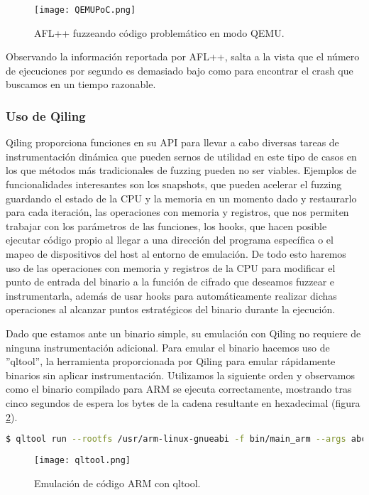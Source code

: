 \begin{figure}[H]
    \centering
    \texttt{[image: QEMUPoC.png]}
    \caption{AFL++ fuzzeando código problemático en modo QEMU.}
    \label{fig:QEMUPoC}
\end{figure}

Observando la información reportada por AFL++, salta a la vista que el número de ejecuciones por segundo es demasiado bajo como para encontrar 
el crash que buscamos en un tiempo razonable.

\subsubsection{Uso de Qiling}
Qiling proporciona funciones en su API para llevar a cabo diversas tareas de instrumentación dinámica que pueden sernos de utilidad en este 
tipo de casos en los que métodos más tradicionales de fuzzing pueden no ser viables. Ejemplos de funcionalidades interesantes son los snapshots,
que pueden acelerar el fuzzing guardando el estado de la CPU y la memoria en un momento dado y restaurarlo para cada iteración, las operaciones 
con memoria y registros, que nos permiten trabajar con los parámetros de las funciones, los hooks, que hacen posible ejecutar código propio al 
llegar a una dirección del programa específica o el mapeo de dispositivos del host al entorno de emulación. De todo esto haremos uso de las 
operaciones con memoria y registros de la CPU para modificar el punto de entrada del binario a la función de cifrado que deseamos fuzzear e 
instrumentarla, además de usar hooks para automáticamente realizar dichas operaciones al alcanzar puntos estratégicos del binario durante la 
ejecución.\bigskip

Dado que estamos ante un binario simple, su emulación con Qiling no requiere de ninguna instrumentación adicional. Para emular el binario 
hacemos uso de ''qltool'', la herramienta proporcionada por Qiling para emular rápidamente binarios sin aplicar instrumentación. Utilizamos la 
siguiente orden y observamos como el binario compilado para ARM se ejecuta correctamente, mostrando tras cinco segundos de espera los
bytes de la cadena resultante en hexadecimal (figura \ref{fig:qltool}).

\begin{lstlisting}[language=bash]
    $ qltool run --rootfs /usr/arm-linux-gnueabi -f bin/main_arm --args abc
\end{lstlisting}

\begin{figure}[H]
    \centering
    \texttt{[image: qltool.png]}
    \caption{Emulación de código ARM con qltool.}
    \label{fig:qltool}
\end{figure}

